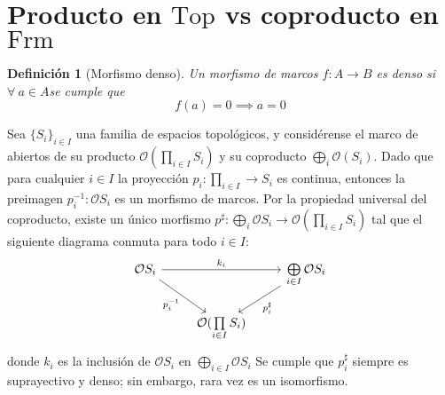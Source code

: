 \documentclass[12pt,letterpaper,titlepage]{article}
\newtheorem*{defn}{Definición}
\theoremstyle{definition}
\newcommand\tps[2]{\texorpdfstring{#1}{#2}}
\newcommand\<{\langle}
\renewcommand\>{\rangle}
\newcommand{\Frm}{\mathrm{Frm}}
\newcommand{\Top}{\mathrm{Top}}
\begin{document}
\section{Producto en \tps{$\Top$}{Top} vs coproducto en \tps{$\Frm$}{Frm}}
\begin{defn}[Morfismo denso]
    Un morfismo de marcos $f:A\to B$ es denso si $\forall \ a\in A$se cumple que
    $$f(a)=0\implies a=0$$
\end{defn}
Sea $\{S_i\}_{i\in I}$ una familia de espacios topológicos, y considérense el marco de abiertos de su producto $\mathcal{O}(\prod\limits_{i\in I}S_i)$ y su coproducto $\bigoplus\limits_{i}\mathcal{O}(S_i)$. Dado que para cualquier $i\in I$ la proyección $p_i:\prod\limits_{i\in I}\to S_i$ es continua, entonces la preimagen $p_i^{-1}:\mathcal{O}S_i$
es un morfismo de marcos. Por la propiedad universal del coproducto, existe un único morfismo $p^\sharp:\bigoplus\limits_{i}\mathcal{O}S_i\to\mathcal{O}(\prod\limits_{i\in I}S_i)$ tal que el siguiente diagrama conmuta para todo $i\in I$:
 \[
            \begin{tikzcd}
                \mathcal{O}S_i \ar[dr,"p_i^{-1}"'] \ar[rr,"k_i"] && \bigoplus\limits_{i\in I}\mathcal{O}S_i \ar[dl,"p_i^\sharp"]
                \\ & \mathcal{O}(\prod\limits_{i\in I}S_i)
            \end{tikzcd}
        \]
donde $k_i$ es la inclusión de $\mathcal{O}S_i$ en $\bigoplus\limits_{i\in I}\mathcal{O}S_i$
Se cumple que $p_i^\sharp$ siempre es suprayectivo y denso; sin embargo, rara vez es un isomorfismo.
\end{document}
